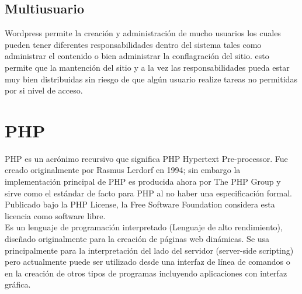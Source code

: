 \subsection{Multiusuario}
Wordpress permite la creación y administración de mucho usuarios los cuales pueden tener diferentes responsabilidades dentro del sistema tales como administrar el contenido o bien administrar la conflagración del sitio. esto permite que la mantención del sitio y a la vez las responsabilidades pueda estar muy bien distribuidas sin riesgo de que algún usuario realize tareas no permitidas por si nivel de acceso.

\section{PHP}
PHP es un acrónimo recursivo que significa PHP Hypertext Pre-processor. Fue creado originalmente por Rasmus Lerdorf en 1994; sin embargo la implementación principal de PHP es producida ahora por The PHP Group y sirve como el estándar de facto para PHP al no haber una especificación formal. Publicado bajo la PHP License, la Free Software Foundation considera esta licencia como software libre.\\

Es un lenguaje de programación interpretado (Lenguaje de alto rendimiento), diseñado originalmente para la creación de páginas web dinámicas. Se usa principalmente para la interpretación del lado del servidor (server-side scripting) pero actualmente puede ser utilizado desde una interfaz de línea de comandos o en la creación de otros tipos de programas incluyendo aplicaciones con interfaz gráfica.

